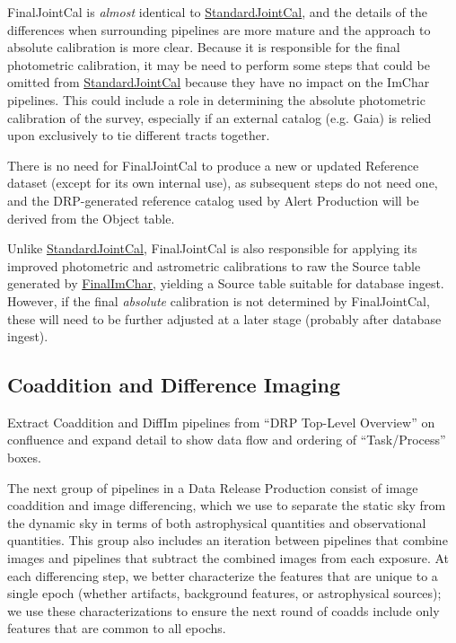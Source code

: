 FinalJointCal is \emph{almost} identical to \hyperref[sec:drpStandardJointCal]{StandardJointCal}, and the details of the differences when surrounding pipelines are more mature and the approach to absolute calibration is more clear.  Because it is responsible for the final photometric calibration, it may be need to perform some steps that could be omitted from \hyperref[sec:drpStandardJointCal]{StandardJointCal} because they have no impact on the ImChar pipelines.  This could include a role in determining the absolute photometric calibration of the survey, especially if an external catalog (e.g. Gaia) is relied upon exclusively to tie different tracts together.

There is no need for FinalJointCal to produce a new or updated Reference dataset (except for its own internal use), as subsequent steps do not need one, and the DRP-generated reference catalog used by Alert Production will be derived from the Object table.

Unlike \hyperref[sec:drpStandardJointCal]{StandardJointCal}, FinalJointCal is also responsible for applying its improved photometric and astrometric calibrations to raw the Source table generated by \hyperref[sec:drpFinalImChar]{FinalImChar}, yielding a Source table suitable for database ingest.  However, if the final \emph{absolute} calibration is not determined by FinalJointCal, these will need to be further adjusted at a later stage (probably after database ingest).

\subsection{Coaddition and Difference Imaging}
\label{sec:drp_coaddition_and_diffim}

\begin{note}
Extract Coaddition and DiffIm pipelines from ``DRP Top-Level Overview'' on confluence and expand detail to show data flow and ordering of ``Task/Process'' boxes.
\end{note}

The next group of pipelines in a Data Release Production consist of image coaddition and image differencing, which we use to separate the static sky from the dynamic sky in terms of both astrophysical quantities and observational quantities.  This group also includes an iteration between pipelines that combine images and pipelines that subtract the combined images from each exposure.  At each differencing step, we better characterize the features that are unique to a single epoch (whether artifacts, background features, or astrophysical sources); we use these characterizations to ensure the next round of coadds include only features that are common to all epochs.

